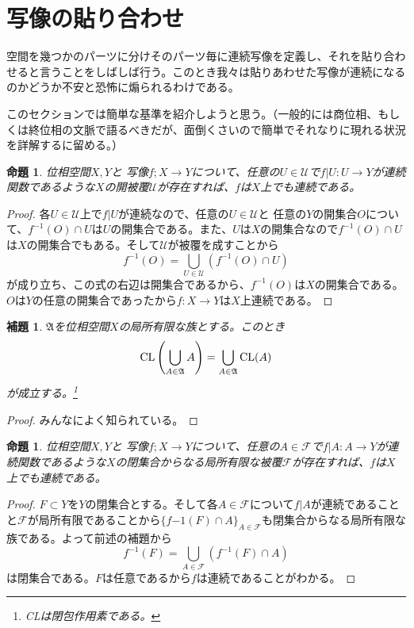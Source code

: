 \documentclass[leqno]{jsarticle}
\newtheorem{prop}[thm]{命題}
\newtheorem{lem}[thm]{補題}
\newcommand{\cl}{\text{{\rm CL}}}
\begin{document}
\section{写像の貼り合わせ}

空間を幾つかのパーツに分けそのパーツ毎に連続写像を定義し、それを貼り合わせると言うことをしばしば行う。このとき我々は貼りあわせた写像が連続になるのかどうか不安と恐怖に煽られるわけである。
\par
このセクションでは簡単な基準を紹介しようと思う。（一般的には商位相、もしくは終位相の文脈で語るべきだが、面倒くさいので簡単でそれなりに現れる状況を詳解するに留める。）


\begin{prop}位相空間$X,Y$と
写像$f;X\to Y$について、任意の$U\in \mathcal{U}$で$f|U:U\to Y$が連続関数であるような$X$の開被覆$\mathcal{U}$が存在すれば、$f$は$X$上でも連続である。
\end{prop}
\begin{proof}
各$U\in \mathcal{U}$上で$f|U$が連続なので、任意の$U\in \mathcal{U}$と
任意の$Y$の開集合$O$について、$f^{-1}(O)\cap U$は$U$の開集合である。また、$U$は$X$の開集合なので$f^{-1}(O)\cap U$は$X$の開集合でもある。そして$\mathcal{U}$が被覆を成すことから
\[
f^{-1}(O)=\bigcup_{U\in \mathcal{U}}(f^{-1}(O)\cap U)
\]
が成り立ち、この式の右辺は開集合であるから、$f^{-1}(O)$は$X$の開集合である。$O$は$Y$の任意の開集合であったから$f:X\to Y$は$X$上連続である。
\end{proof}

\begin{lem}\label{heihou}
$\mathfrak{A}$を位相空間$X$の局所有限な族とする。このとき
\[
\cl\left(\bigcup_{A\in \mathfrak{A}}A\right)=\bigcup_{A\in \mathfrak{A}}\cl(A)
\]
が成立する。\footnote{CLは閉包作用素である。}
\end{lem}
\begin{proof}
みんなによく知られている。
\end{proof}


\begin{prop}位相空間$X,Y$と
写像$f;X\to Y$について、任意の$A\in \mathcal{F}$で$f|A:A\to Y$が連続関数であるような$X$の閉集合からなる局所有限な被覆$\mathcal{F}$が存在すれば、$f$は$X$上でも連続である。
\end{prop}
\begin{proof}
$F\subset Y$を$Y$の閉集合とする。そして各$A\in \mathcal{F}$について$f|A$が連続であることと$\mathcal{F}$が局所有限であることから$\{f{-1}(F)\cap A\}_{A\in \mathcal{F}}$も閉集合からなる局所有限な族である。よって前述の補題から
\[
f^{-1}(F)=\bigcup_{A\in \mathcal{F}}(f^{-1}(F)\cap A)
\]
は閉集合である。$F$は任意であるから$f$は連続であることがわかる。
\end{proof}
\end{document}
